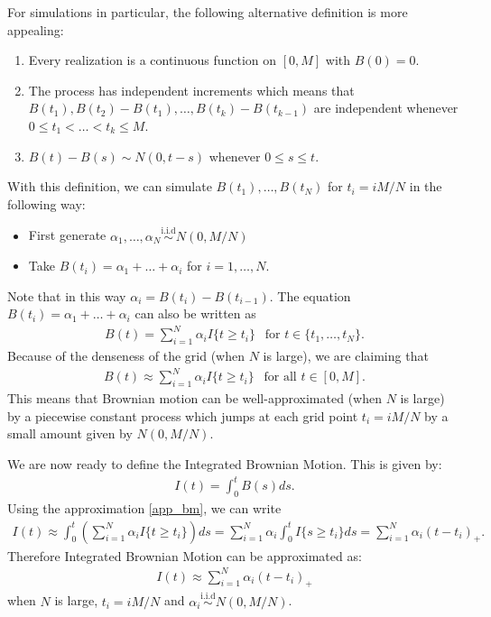 \documentclass{scrartcl}
\begin{document}
For simulations in particular, the following alternative definition is
more appealing:
\begin{enumerate}
\item Every realization is a continuous function on $[0, M]$ with
  $B(0) = 0$.
\item The process has independent increments which means that $B(t_1),
  B(t_2) - B(t_1), \dots, B(t_k) - B(t_{k-1})$ are independent
  whenever $0 \leq t_1 < \dots < t_k \leq M$.
\item $B(t) - B(s) \sim N(0, t-s)$ whenever $0 \leq s \leq t$. 
\end{enumerate}
With this definition, we can simulate $B(t_1), \dots, B(t_N)$ for $t_i
= iM/N$ in the following way:
\begin{itemize}
\item First generate $\alpha_1, \dots, \alpha_N
  \overset{\text{i.i.d}}{\sim} N(0, M/N)$
\item Take $B(t_i) = \alpha_1 + \dots + \alpha_i$ for $i = 1, \dots,
  N$. 
\end{itemize}
Note that in this way $\alpha_i = B(t_i) - B(t_{i-1})$. The equation
$B(t_i) = \alpha_1 + \dots + \alpha_i$ can also be written as
\begin{align*}
  B(t) = \sum_{i=1}^N \alpha_i I\{t \geq t_i\} ~~ \text{ for $t \in
  \{t_1, \dots, t_N\}$}. 
\end{align*}
Because of the denseness of the grid (when $N$ is  large), we are
claiming that
\begin{align}\label{app_bm}
  B(t) \approx \sum_{i=1}^N \alpha_i I\{t \geq t_i\} ~~ \text{ for all
  $t \in [0, M]$}. 
\end{align}
This means that Brownian motion can be well-approximated (when $N$ is
large) by a piecewise constant process which jumps at each grid point
$t_i = iM/N$ by a small amount given by $N(0, M/N)$. 

We are now ready to define the Integrated Brownian Motion. This is
given by:
\begin{align}\label{ibm_def}
  I(t) = \int_0^t B(s) ds. 
\end{align}
Using the approximation \eqref{app_bm}, we can write
\begin{align*}
  I(t) \approx \int_0^t \left(\sum_{i=1}^N \alpha_i I\{t \geq t_i\} \right)
  ds = \sum_{i=1}^N \alpha_i \int_0^t I\{s \geq t_i\} ds =
  \sum_{i=1}^N \alpha_i (t - t_i)_+. 
\end{align*}
Therefore Integrated Brownian Motion can be approximated as:
\begin{align}\label{ibm_approx}
  I(t) \approx   \sum_{i=1}^N \alpha_i (t - t_i)_+ 
\end{align}
when $N$ is large, $t_i = iM/N$ and $\alpha_i
\overset{\text{i.i.d}}{\sim} N(0, M/N)$.
\end{document}
